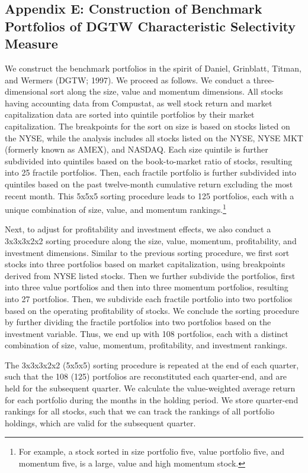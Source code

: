 \subsection*{Appendix E: Construction of Benchmark Portfolios of DGTW Characteristic Selectivity Measure}
We construct the benchmark portfolios in the spirit of Daniel, Grinblatt, Titman, and Wermers (DGTW; 1997). We proceed as follows. We conduct a three-dimensional sort along the size, value and momentum dimensions. All stocks having accounting data from Compustat, as well stock return and market capitalization data are sorted into quintile portfolios by their market capitalization. The breakpoints for the sort on size is based on stocks listed on the NYSE, while the analysis includes all stocks listed on the NYSE, NYSE MKT (formerly known as AMEX), and NASDAQ. Each size quintile is further subdivided into quintiles based on the book-to-market ratio of stocks, resulting into 25 fractile portfolios. Then, each fractile portfolio is further subdivided into quintiles based on the past twelve-month cumulative return excluding the most recent month. This 5x5x5 sorting procedure leads to 125 portfolios, each with a unique combination of size, value, and momentum rankings.\footnote{For example, a stock sorted in size portfolio five, value portfolio five, and momentum five, is a large, value and high momentum stock.} 
\par Next, to adjust for profitability and investment effects, we also conduct a 3x3x3x2x2 sorting procedure along the size, value, momentum, profitability, and investment dimensions. Similar to the previous sorting procedure, we first sort stocks into three portfolios based on market capitalization, using breakpoints derived from NYSE listed stocks. Then we further subdivide the portfolios, first into three value portfolios and then into three momentum portfolios, resulting into 27 portfolios. Then, we subdivide each fractile portfolio into two portfolios based on the operating profitability of stocks. We conclude the sorting procedure by further dividing the fractile portfolios into two portfolios based on the investment variable. Thus, we end up with 108 portfolios, each with a distinct combination of size, value, momentum, profitability, and investment rankings. 
\par The 3x3x3x2x2 (5x5x5) sorting procedure is repeated at the end of each quarter, such that the 108 (125) portfolios are reconstituted each quarter-end, and are held for the subsequent quarter. We calculate the value-weighted average return for each portfolio during the months in the holding period. We store quarter-end rankings for all stocks, such that we can track the rankings of all portfolio holdings, which are valid for the subsequent quarter. 


